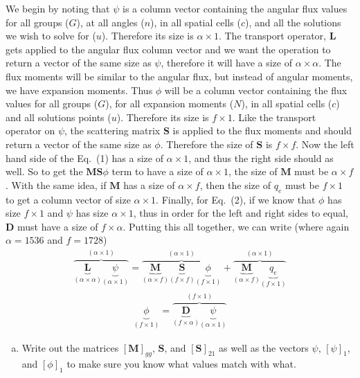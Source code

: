 \documentclass[10pt]{article}
\begin{document}
We begin by noting that $\psi$ is a column vector containing the angular flux values for all groups ($G$), at all angles ($n$), in all spatial cells ($c$), and all the solutions we wish to solve for ($u$). Therefore its size is $\alpha \times 1$. The transport operator, $\textbf{L}$ gets applied to the angular flux column vector and we want the operation to return a vector of the same size as $\psi$, therefore it will have a size of $\alpha \times \alpha$. The flux moments will be similar to the angular flux, but instead of angular moments, we have expansion moments. Thus $\phi$ will be a column vector containing the flux values for all groups ($G$), for all expansion moments ($N$), in all spatial cells ($c$) and all solutions points ($u$). Therefore its size is $f \times 1$. Like the transport operator on $\psi$, the scattering matrix $\textbf{S}$ is applied to the flux moments and should return a vector of the same size as $\phi$. Therefore the size of $\textbf{S}$ is $f \times f$. Now the left hand side of the Eq.~(1) has a size of $\alpha \times 1$, and thus the right side should as well. So to get the $\textbf{MS}\phi$ term to have a size of $\alpha \times 1$, the size of $\textbf{M}$ must be $\alpha \times f$. With the same idea, if $\textbf{M}$ has a size of $\alpha \times f$, then the size of $q_e$ must be $f \times 1$ to get a column vector of size $\alpha \times 1$. Finally, for Eq.~(2), if we know that $\phi$ has size $f \times 1$ and $\psi$ has size $\alpha \times 1$, thus in order for the left and right sides to equal, $\textbf{D}$ must have a size of $ f \times \alpha$. Putting this all together, we can write (where again $\alpha = 1536$ and $f = 1728$)
%
\begin{align*}
	   \overbrace{ \underbrace{\textbf{L}}_{(\alpha \times \alpha)} \underbrace{\psi}_{(\alpha \times 1)} }^{(\alpha \times 1)} = \overbrace{  \underbrace{\textbf{M}}_{(\alpha \times f)}  \underbrace{\textbf{S}}_{(f \times f)} \underbrace{\phi}_{(f \times 1)} }^{(\alpha \times 1)} + \overbrace{ \underbrace{\textbf{M}}_{(\alpha \times f)} \underbrace{q_e}_{(f \times 1)} }^{(\alpha \times 1)}
\end{align*}
\vspace{-10pt}
\begin{align*}
	\underbrace{\phi}_{(f \times 1)} = \overbrace{\underbrace{\textbf{D}}_{(f \times \alpha)} \underbrace{\psi}_{(\alpha \times 1)}}^{(f \times 1)}
\end{align*}

%
%
%

\vspace{10pt}
\begin{enumerate}[(b)]
\item Write out the matrices $[\textbf{M}]_{gg}$, $\textbf{S}$, and $[\textbf{S}]_{21}$ as well as the vectors $\psi$, $[\psi]_1$, and $[\phi]_1$ to make sure you know what values match with what.
\end{enumerate}
\end{document}
